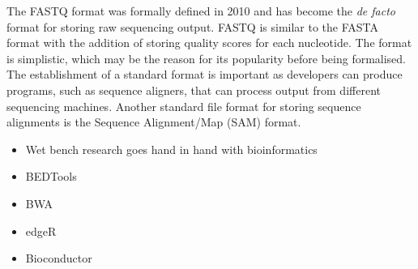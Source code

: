 The FASTQ format was formally defined in 2010\cite{pmid20015970} and has become the \textit{de facto} format for storing raw sequencing output. FASTQ is similar to the FASTA format with the addition of storing quality scores for each nucleotide. The format is simplistic, which may be the reason for its popularity before being formalised. The establishment of a standard format is important as developers can produce programs, such as sequence aligners, that can process output from different sequencing machines. Another standard file format for storing sequence alignments is the Sequence Alignment/Map (SAM) format\cite{pmid19505943}.

\begin{itemize}
   \item Wet bench research goes hand in hand with bioinformatics
   \item BEDTools \cite{pmid20110278}
   \item BWA \cite{pmid19451168}
   \item edgeR \cite{pmid19910308}
   \item Bioconductor \cite{pmid15461798}
\end{itemize}
